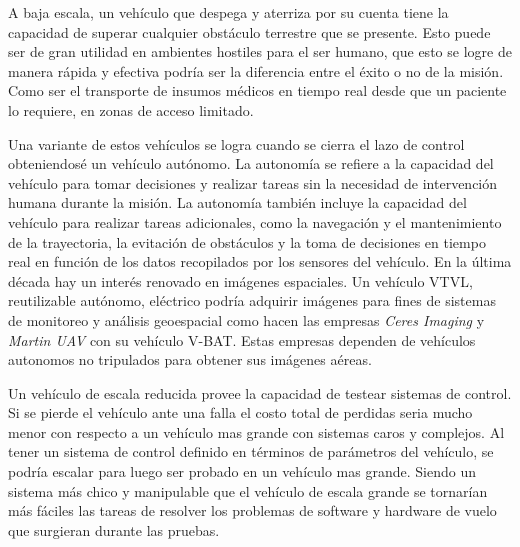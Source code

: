 \medskip

\medskip

A baja escala, un vehículo que despega y aterriza por su cuenta tiene la capacidad de
superar cualquier obstáculo terrestre que se presente. Esto puede ser de gran utilidad en ambientes hostiles para el
ser humano, que esto se logre de manera rápida y efectiva podría ser la diferencia entre el
éxito o no de la misión.
Como ser el transporte de insumos médicos en tiempo real desde que un paciente lo requiere,
en zonas de acceso limitado.

\medskip

Una variante de estos vehículos se logra cuando se cierra el lazo de control obteniendosé un vehículo autónomo. La autonomía se refiere a la capacidad del vehículo para tomar decisiones y realizar tareas sin la necesidad de intervención humana durante la misión. La autonomía también incluye la capacidad del vehículo para realizar tareas adicionales, como la navegación y el mantenimiento de la trayectoria, la evitación de obstáculos y la toma de decisiones en tiempo real en función de los datos recopilados por los sensores del vehículo. En la última década hay un interés renovado en imágenes espaciales. Un vehículo VTVL, reutilizable autónomo, eléctrico podría adquirir imágenes para fines de sistemas de monitoreo y análisis geoespacial como hacen las empresas \textit{Ceres Imaging} y \textit{Martin UAV} con su vehículo V-BAT. Estas empresas dependen de vehículos autonomos no tripulados para obtener sus imágenes aéreas.

\medskip


\medskip

Un vehículo de escala reducida provee la capacidad de testear sistemas de control. Si se pierde el vehículo ante una falla el costo total de perdidas seria mucho menor con respecto a un vehículo mas grande con sistemas caros y complejos. Al tener un sistema de control definido en términos de parámetros del vehículo, se podría escalar para luego ser probado en un vehículo mas grande. Siendo un sistema más chico y manipulable que el vehículo de escala grande se tornarían más fáciles las tareas de resolver los problemas de software y hardware de vuelo que surgieran durante las pruebas.

